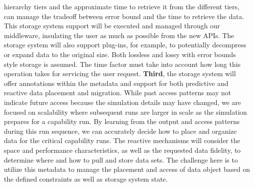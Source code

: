 \documentclass[11pt,letterpaper]{article}
\begin{document}
hierarchy tiers and the approximate time to retrieve it from the different
tiers, can manage the tradeoff between error bound and the time to
retrieve the data. This storage system support will be executed and managed through our middleware, 
insulating the user as much as possible from the new APIs. The storage system
will also support plug-ins, for example, to potentially decompress or expand data to the
original size. Both lossless and lossy with error bounds style storage is
assumed. The time factor must take into account how long this operation takes
for servicing the user request. 
%
\textbf{Third}, the storage system will offer annotations within the metadata
and support for both predictive and reactive data placement and migration.
While past access patterns may not indicate future access because the
simulation details may have changed, we are focused on scalability where
subsequent runs are larger in scale as the simulation prepares for a capability run.  By
learning from the output and access patterns during this run sequence, we can
accurately decide how to place and organize data for the critical capability
runs. The reactive mechanisms will consider the space and performance
characteristics, as well as the requested data fidelity, to determine where and
how to pull and store data sets. The challenge here is to utilize this
metadata to manage the placement and access of data object based on the
defined constraints as well as storage system state. 
\end{document}
